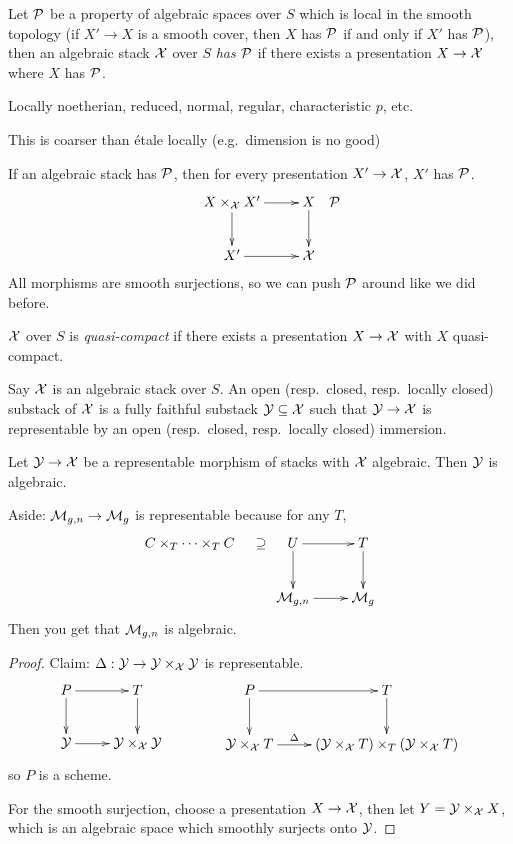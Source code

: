  Let $\P$ be a property of algebraic spaces over $S$ which is local in the smooth
 topology (if $X'\to X$ is a smooth cover, then $X$ has $\P$ if and only if $X'$ has
 $\P$), then an algebraic stack $\X$ over $S$ \emph{has $\P$} if there exists a
 presentation $X\to \X$ where $X$ has $\P$.
 \begin{example}
   Locally noetherian, reduced, normal, regular, characteristic $p$, etc.
 \end{example}
 This is coarser than \'etale locally (e.g.~dimension is no good)
 \begin{remark}
   If an algebraic stack has $\P$, then for every presentation $X'\to \X$, $X'$ has $\P$.
   \[\xymatrix{
    X\times_\X X'\ar[r]\ar[d] & X\rlap{$\quad\P$}\ar[d]\\
    X'\ar[r] & \X
   }\]
   All morphisms are smooth surjections, so we can push $\P$ around like we did before.
 \end{remark}
 \begin{definition}
   $\X$ over $S$ is \emph{quasi-compact} if there exists a presentation $X\to \X$ with
   $X$ quasi-compact.
 \end{definition}
 \begin{definition}
   Say $\X$ is an algebraic stack over $S$. An open (resp.~closed, resp.~locally closed)
   substack of $\X$ is a fully faithful substack $\Y\subseteq \X$ such that $\Y\to \X$ is
   representable by an open (resp.~closed, resp.~locally closed) immersion.
 \end{definition}
 \begin{lemma}
   Let $\Y\to \X$ be a representable morphism of stacks with $\X$ algebraic. Then $\Y$ is
   algebraic.
 \end{lemma}
 Aside: $\M_{g,n}\to \M_g$ is representable because for any $T$,
 \[\xymatrix{
    C\times_T\cdots\times_T C\ar@{}[r]|<>(.5){\txt{$\supseteq$}} & U\ar[d] \ar[r] & T\ar[d]\\
    & \M_{g,n} \ar[r] & \M_g
 }\]
 Then you get that $\M_{g,n}$ is algebraic.
 \begin{proof}
   Claim: $\Delta:\Y\to \Y\times_\X \Y$ is representable.
   \[\xymatrix{
    P\ar[r]\ar[d] & T\ar[d]\\
    \Y\ar[r]  & \Y\times_\X \Y
   }\qquad\qquad
   \xymatrix{
    P\ar[r]\ar[d]& T\ar[d]\\
   \Y\times_\X T\ar[r]^<>(.5)\Delta & (\Y\times_\X T)\times_T (\Y\times_\X T)
   }\]
   so $P$ is a scheme.

   For the smooth surjection, choose a presentation $X\to \X$, then let $Y=\Y\times_\X
   X$, which is an algebraic space which smoothly surjects onto $\Y$.
 \end{proof}
